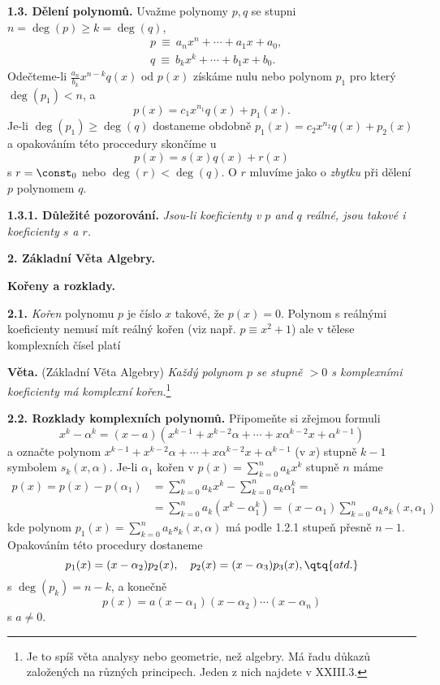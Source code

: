 \documentclass[12pt]{article}
\begin{document}
{ {\bf 1.3. Dělení polynomů.} Uvažme polynomy $p,q$ se stupni $n=\deg(p)\geq k=\deg(q)$,
 $$
 \begin{aligned}
 &p\ \equiv\ a_nx^n+\cdots+a_1x+a_0,\\
 &q\ \equiv\ b_kx^k+\cdots+b_1x+b_0.
 \end{aligned}
 $$
Odečteme-li $\frac{a_n}{b_k}x^{n-k}q(x)$ od $p(x)$ získáme nulu nebo polynom $p_1$ pro který
 $\deg(p_1)<n$,
a
 $$
 p(x)=c_1x^{n_1}q(x)+ p_1(x).
 $$
 Je-li $\deg(p_1)\geq \deg(q)$ dostaneme obdobně $p_1(x)=c_2x^{n_2}q(x)+ p_2(x)$ a opakováním této proccedury
skončíme u 
 $$
 p(x)=s(x)q(x)+r(x)
 $$
s $r=\const_0$ nebo $\deg(r)<\deg(q)$. O $r$ mluvíme jako o  {\em zbytku} při dělení
 $p$ polynomem $q$.
 
 \medskip
 
 {\bf 1.3.1. Důležité pozorování.} {\em Jsou-li koeficienty v $p$ and $q$ reálné, jsou takové i koeficienty  $s$ a $r$.}
 
  
 \vskip10mm
 
 {\large\bf 2. Základní Věta  Algebry.}
 
 \smallskip
 
  \hskip7mm{\large\bf Kořeny a rozklady.} 
 
 \bigskip
 
 {\bf 2.1.}  {\em Kořen} polynomu $p$ je číslo $x$ takové, že $p(x)=0$. Polynom s reálnými koeficienty nemusí mít reálný kořen  (viz např. $p\equiv x^2+1$) ale v tělese komplexních čísel platí
 \medskip
 
 {\bf Věta.} (Základní Věta Algebry) {\em Každý polynom $p$ se stupně $>0$ s komplexními koeficienty má komplexní kořen.}\footnote{Je to spíš věta analysy nebo geometrie, než algebry. Má řadu důkazů založených na různých principech. Jeden z nich najdete v XXIII.3.}
 
 \medskip
 
 {\bf 2.2. Rozklady komplexních polynomů.} Připomeňte si zřejmou formuli
 $$
  x^k-\alpha^k=(x-a)(x^{k-1}+x^{k-2}\alpha+\cdots+x\alpha^{k-2}x+\alpha^{k-1})
 $$
a označte polynom $x^{k-1}+x^{k-2}\alpha+\cdots+x\alpha^{k-2}x+\alpha^{k-1}$ (v $x$) stupně $k-1$
 symbolem $s_k(x,\alpha)$. Je-li $\alpha_1$ kořen v $p(x)=\sum_{k=0}^na_kx^k$ stupně $n$ máme
 $$
 \begin{aligned}
 p(x)=p(x)-p(\alpha_1)&= \sum_{k=0}^na_kx^k-\sum_{k=0}^na_k\alpha_1^k=\\
 &=\sum_{k=0}^na_k(x^k-\alpha_1^k)=(x-\alpha_1)\sum_{k=0}^na_ks_k(x,\alpha_1)
 \end{aligned}
 $$
 kde polynom $p_1(x)=\sum_{k=0}^na_ks_k(x,\alpha)$ má podle 1.2.1 stupeň přesně $n-1$.
 Opakováním této procedury dostaneme
 $$
 p_1(x)=(x-\alpha_2)p_2(x), \quad p_2(x)=(x-\alpha_3)p_3(x),\qtq{atd.}
 $$ 
 s $\deg (p_k)=n-k$, a konečně
\begin{equation}
 p(x)=a(x-\alpha_1)(x-\alpha_2)\cdots(x-\alpha_n)  \tag{$*$}
 \end{equation}
s $a\neq 0$.
 
}
\end{document}

